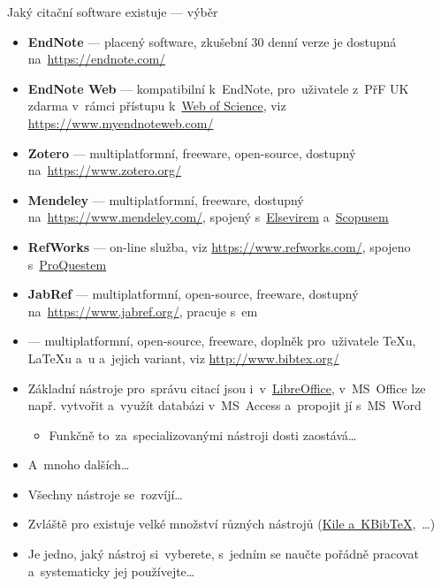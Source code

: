 \documentclass[compress, ucs, xelatex, 11pt, xcolor=svgnames, aspectratio=169,
	hyperref={
		bookmarks=true,
		unicode=true,
		colorlinks=true,
		pdftitle={Citacni software},
		plainpages=false,
		pdfauthor={Vojtech Zeisek},
		pdfsubject={Kratky uvod do citacniho software},
		pdfcreator={XeLaTeX},
		pdfkeywords={citace, reference, software, literatura},
		linkcolor=Crimson, %
		anchorcolor=Magenta, %
		citecolor=Magenta, %
		filecolor=Magenta, %
		menucolor=Magenta, %
		urlcolor=DarkTurquoise, %
		pdftex},
	url={hyphens, lowtilde} %
	]{beamer}
\begin{document}
\begin{frame}[allowframebreaks]{Jaký citační software existuje --- výběr}
	\begin{itemize}
		\item \textbf{EndNote} --- placený software, zkušební 30 denní verze je dostupná na~\url{https://endnote.com/}
		\item \textbf{EndNote Web} --- kompatibilní k~EndNote, pro~uživatele z~PřF UK zdarma v~rámci přístupu k~\href{https://apps.webofknowledge.com/}{Web of Science}, viz \url{https://www.myendnoteweb.com/}
		\item \textbf{Zotero} --- multiplatformní, freeware, open-source, dostupný na~\url{https://www.zotero.org/}
		\item \textbf{Mendeley} --- multiplatformní, freeware, dostupný na~\url{https://www.mendeley.com/}, spojený s~\href{https://www.elsevier.com/}{Elsevirem}  a~\href{https://www.scopus.com/}{Scopusem}
		\item \textbf{RefWorks} --- on-line služba, viz \url{https://www.refworks.com/}, spojeno s~\href{https://www.proquest.com/}{ProQuestem}
		\item \textbf{JabRef} --- multiplatformní, open-source, freeware, dostupný na~\url{https://www.jabref.org/}, pracuje s~\BibTeX em
		\item \textbf{\BibTeX} --- multiplatformní, open-source, freeware, doplněk pro~uživatele \TeX u, \LaTeX u a~\XeLaTeX u a~jejich variant, viz \url{http://www.bibtex.org/}
		\item Základní nástroje pro~správu citací jsou i~v~\href{https://www.openoffice.cz/navody/jak-vytvorit-a-upravovat-seznam-pouzite-literatury}{LibreOffice}, v~MS~Office lze např. vytvořit a~využít databázi v~MS~Access a~propojit jí s~MS~Word
		\begin{itemize}
			\item Funkčně to~za~specializovanými nástroji dosti zaostává\ldots
		\end{itemize}
		\item A~mnoho dalších\ldots
		\item Všechny nástroje se~rozvíjí\ldots
		\item Zvláště pro \BibTeX existuje velké množství různých nástrojů (\href{https://www.linuxexpres.cz/software/kile-a-kbibtex}{Kile a~KBibTeX},~\ldots)
		\item Je jedno, jaký nástroj si~vyberete, s~jedním se naučte pořádně pracovat a~systematicky jej používejte\ldots
	\end{itemize}
\end{frame}
\end{document}
